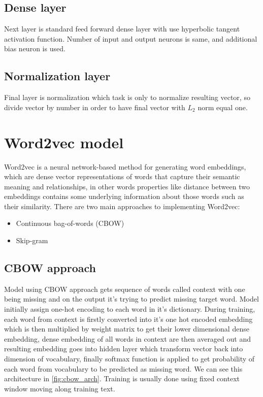 \subsection{Dense layer}

Next layer is standard feed forward dense layer with use hyperbolic tangent activation function. Number of input and output neurons is same, and additional bias neuron is used.

\subsection{Normalization layer}

Final layer is normalization which task is only to normalize resulting vector, so divide vector by number in order to have final vector with $L_2$ norm equal one.

\section{Word2vec model}
\label{theoryW2v}

Word2vec is a neural network-based method for generating word embeddings, which are dense vector representations of words that capture their semantic meaning and relationships, in other words properties like distance between two embeddings contains some underlying information about those words such as their similarity. There are two main approaches to implementing Word2vec:

\begin{itemize}
	\item Continuous bag-of-words (CBOW) 
	\item Skip-gram
\end{itemize}

\subsection{CBOW approach}

Model using CBOW approach gets sequence of words called context with one being missing and on the output it's trying to predict missing target word. Model initially assign one-hot encoding to each word in it's dictionary. During training, each word from context is firstly converted into it's one hot encoded embedding which is then multiplied by weight matrix to get their lower dimensional dense embedding, dense embedding of all words in context are then averaged out and resulting embedding goes into hidden layer which transform vector back into dimension of vocabulary, finally softmax function is applied to get probability of each word from vocabulary to be predicted as missing word. We can see this architecture in \ref{fig:cbow_arch}. Training is usually done using fixed context window moving along training text.

